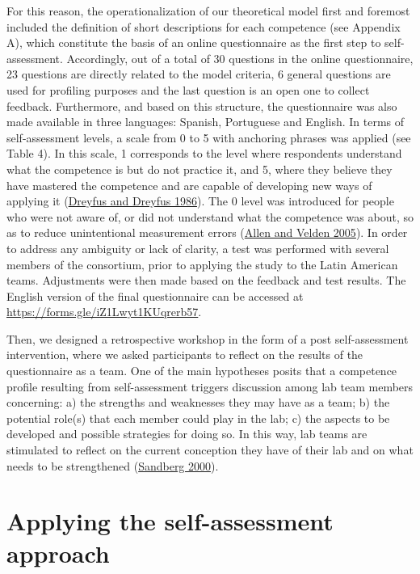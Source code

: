 \documentclass[AMA,STIX1COL,APA,STIX2COL]{WileyNJD-v2}
\begin{document}
For this reason, the operationalization of our theoretical model first
and foremost included the definition of short descriptions for each
competence (see Appendix A), which constitute the basis of an online
questionnaire as the first step to self-assessment. Accordingly, out of
a total of 30 questions in the online questionnaire, 23 questions are
directly related to the model criteria, 6 general questions are used for
profiling purposes and the last question is an open one to collect
feedback. Furthermore, and based on this structure, the questionnaire
was also made available in three languages: Spanish, Portuguese and
English. In terms of self-assessment levels, a scale from 0 to 5 with
anchoring phrases was applied (see Table 4). In this scale, 1
corresponds to the level where respondents understand what the
competence is but do not practice it, and 5, where they believe they
have mastered the competence and are capable of developing new ways of
applying it (\protect\hyperlink{ref-Dreyfus1986}{Dreyfus and Dreyfus
1986}). The 0 level was introduced for people who were not aware of, or
did not understand what the competence was about, so as to reduce
unintentional measurement errors
(\protect\hyperlink{ref-Allen2005}{Allen and Velden 2005}). In order to
address any ambiguity or lack of clarity, a test was performed with
several members of the consortium, prior to applying the study to the
Latin American teams. Adjustments were then made based on the feedback
and test results. The English version of the final questionnaire can be
accessed at \url{https://forms.gle/iZ1Lwyt1KUqrerb57}.

Then, we designed a retrospective workshop in the form of a post
self-assessment intervention, where we asked participants to reflect on
the results of the questionnaire as a team. One of the main hypotheses
posits that a competence profile resulting from self-assessment triggers
discussion among lab team members concerning: a) the strengths and
weaknesses they may have as a team; b) the potential role(s) that each
member could play in the lab; c) the aspects to be developed and
possible strategies for doing so. In this way, lab teams are stimulated
to reflect on the current conception they have of their lab and on what
needs to be strengthened (\protect\hyperlink{ref-Sandberg2000}{Sandberg
2000}).

\hypertarget{applying-the-self-assessment-approach}{%
\section{Applying the self-assessment
approach}\label{applying-the-self-assessment-approach}}
\end{document}
